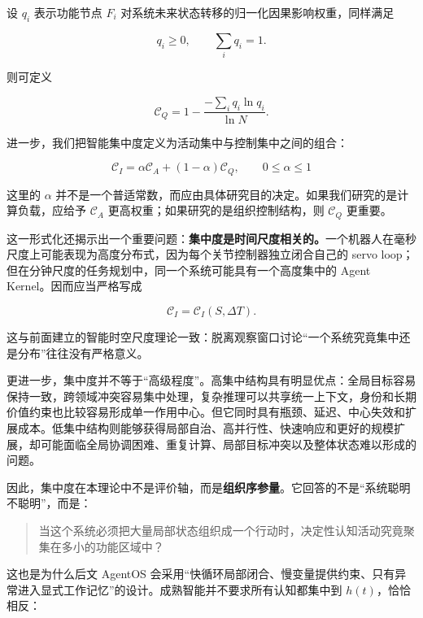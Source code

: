 设 $q_i$ 表示功能节点 $F_i$ 对系统未来状态转移的归一化因果影响权重，同样满足

\begin{equation}
q_i\geq 0,
\qquad
\sum_i q_i=1.
\end{equation}

则可定义

\begin{equation}
\mathcal{C}_{Q}
=
1-
\frac{
-\sum_i q_i\ln q_i
}{
\ln N
}.
\end{equation}

进一步，我们把智能集中度定义为活动集中与控制集中之间的组合：

\begin{equation}
\boxed{
\mathcal{C}_{I}
=
\alpha\mathcal{C}_{A}
+
(1-\alpha)\mathcal{C}_{Q},
\qquad
0\leq\alpha\leq1
}
\end{equation}

这里的 $\alpha$ 并不是一个普适常数，而应由具体研究目的决定。如果我们研究的是计算负载，应给予 $\mathcal{C}_{A}$ 更高权重；如果研究的是组织控制结构，则 $\mathcal{C}_{Q}$ 更重要。

这一形式化还揭示出一个重要问题：\textbf{集中度是时间尺度相关的。}一个机器人在毫秒尺度上可能表现为高度分布式，因为每个关节控制器独立闭合自己的 servo loop；但在分钟尺度的任务规划中，同一个系统可能具有一个高度集中的 Agent Kernel。因而应当严格写成

\begin{equation}
\mathcal{C}_{I}
=
\mathcal{C}_{I}(S,\Delta T).
\end{equation}

这与前面建立的智能时空尺度理论一致：脱离观察窗口讨论“一个系统究竟集中还是分布”往往没有严格意义。

更进一步，集中度并不等于“高级程度”。高集中结构具有明显优点：全局目标容易保持一致，跨领域冲突容易集中处理，复杂推理可以共享统一上下文，身份和长期价值约束也比较容易形成单一作用中心。但它同时具有瓶颈、延迟、中心失效和扩展成本。低集中结构则能够获得局部自治、高并行性、快速响应和更好的规模扩展，却可能面临全局协调困难、重复计算、局部目标冲突以及整体状态难以形成的问题。

因此，集中度在本理论中不是评价轴，而是\textbf{组织序参量}。它回答的不是“系统聪明不聪明”，而是：

\begin{quote}
当这个系统必须把大量局部状态组织成一个行动时，决定性认知活动究竟聚集在多小的功能区域中？
\end{quote}

这也是为什么后文 AgentOS 会采用“快循环局部闭合、慢变量提供约束、只有异常进入显式工作记忆”的设计。成熟智能并不要求所有认知都集中到 $h(t)$，恰恰相反：

